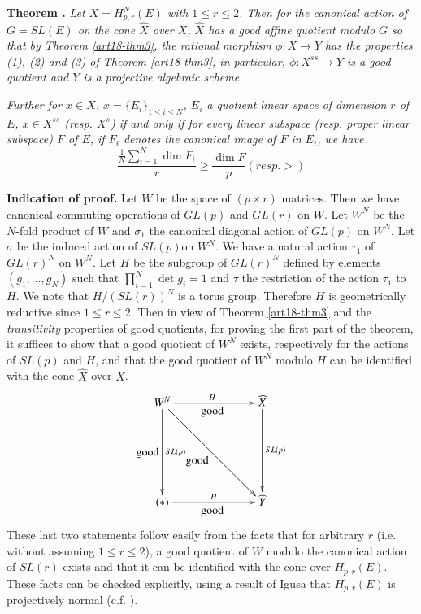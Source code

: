 \medskip
\noindent
{\bf Theorem .\label{art18-thm4}}
{\em Let $X=H^{N}_{p,r}(E)$ with $1\leq r\leq 2$. Then for the canonical action of $G=SL(E)$ on the cone $\widehat{X}$ over $X$, $\widehat{X}$ has a good affine quotient modulo $G$ so that by Theorem \ref{art18-thm3}, the rational morphism $\phi:X\to Y$ has the properties {\rm(1), (2)} and {\rm(3)} of Theorem \ref{art18-thm3}; in particular, $\phi:X^{ss}\to Y$ is a good quotient and $Y$ is a projective algebraic scheme.}

{\em Further for $x\in X$, $x=\{E_{i}\}_{1\leq i\leq N}$, $E_{i}$ a quotient linear space of dimension $r$ of $E$, $x\in X^{ss}$ (resp. $X^{s}$) if and only if for every linear subspace (resp. proper linear subspace) $F$ of $E$, if $F_{i}$ denotes the canonical image of $F$ in $E_{i}$, we have}
$$
\frac{\frac{1}{N}\sum\limits^{N}_{i=1}\dim F_{i}}{r}\geq \frac{\dim F}{p}(resp. >)
$$

\smallskip
\noindent
{\bf Indication of proof.} Let $W$ be the space of $(p\times r)$ matrices. Then we have canonical commuting operations of $GL(p)$ and $GL(r)$ on $W$. Let $W^{N}$ be the $N$-fold product of $W$ and $\sigma_{1}$ the canonical diagonal action of $GL(p)$ on $W^{N}$. Let $\sigma$ be the induced action of $SL(p)$\pageoriginale on $W^{N}$. We have a natural action $\tau_{1}$ of $GL(r)^{N}$ on $W^{N}$. Let $H$ be the subgroup of $GL(r)^{N}$ defined by elements $(g_{1},\ldots,g_{N})$ such that $\prod\limits^{N}_{i=1}\det g_{i}=1$ and $\tau$ the restriction of the action $\tau_{1}$ to $H$. We note that $H/(SL(r))^{N}$ is a torus group. Therefore $H$ is geometrically reductive since $1\leq r\leq 2$. Then in view of Theorem \ref{art18-thm3} and the {\em transitivity} properties of good quotients, for proving the first part of the theorem, it suffices to show that a good quotient of $W^{N}$ exists, respectively for the actions of $SL(p)$ and $H$, and that the good quotient of $W^{N}$ modulo $H$ can be identified with the cone $\widehat{X}$ over $X$.
\[
\xymatrix@=2.5cm{
W^{N}\ar[d]_{\displaystyle\text{good}}^-{SL(p)} \ar[r]^{H}_{\displaystyle\text{good}}\ar[dr]_-{\displaystyle\text{good}} & \widehat{X}\ar[d]^-{SL(p)}\\
(*)\ar[r]^-{H}_{\displaystyle\text{good}} & \widehat{Y}
}
\]
These last two statements follow easily from the facts that for arbitrary $r$ (i.e. without assuming $1\leq r\leq 2$), a good quotient of $W$ modulo the canonical action of $SL(r)$ exists and that it can be identified with the cone over $H_{p,r}(E)$. These facts can be checked explicitly, using a result of Igusa that $H_{p,r}(E)$ is projectively normal (c.f. \cite{art18-key4}).

